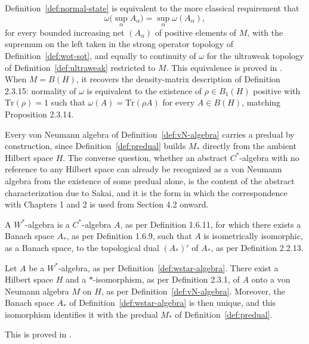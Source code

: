 \begin{remark}
	Definition~\ref{def:normal-state} is equivalent to the more classical
	requirement that
	\[
	\omega\Big(\sup_\alpha A_\alpha\Big) = \sup_\alpha \omega(A_\alpha),
	\]
	for every bounded increasing net $(A_\alpha)$ of positive elements of
	$M$, with the supremum on the left taken in the strong operator
	topology of Definition~\ref{def:wot-sot}, and equally to continuity of
	$\omega$ for the ultraweak topology of Definition~\ref{def:ultraweak}
	restricted to $M$. This equivalence is proved in \cite[TODO:
	collocazione precisa]{TODO-normalStates}. When $M = B(H)$, it recovers
	the density-matrix description of Definition 2.3.15: normality of
	$\omega$ is equivalent to the existence of $\rho \in B_1(H)$ positive
	with $\mathrm{Tr}(\rho) = 1$ such that $\omega(A) = \mathrm{Tr}(\rho A)$
	for every $A \in B(H)$, matching Proposition 2.3.14.
\end{remark}

Every von Neumann algebra of Definition~\ref{def:vN-algebra} carries a
predual by construction, since Definition~\ref{def:predual} builds
$M_*$ directly from the ambient Hilbert space $H$. The converse
question, whether an abstract $C^*$-algebra with no reference to any
Hilbert space can already be recognized as a von Neumann algebra from
the existence of some predual alone, is the content of the abstract
characterization due to Sakai, and it is the form in which the
correspondence with Chapters 1 and 2 is used from Section 4.2 onward.

\begin{definition}[$W^*$-algebra]\label{def:wstar-algebra}
	A $W^*$-algebra is a $C^*$-algebra $A$, as per Definition 1.6.11, for
	which there exists a Banach space $A_*$, as per Definition 1.6.9, such
	that $A$ is isometrically isomorphic, as a Banach space, to the
	topological dual $(A_*)'$ of $A_*$, as per Definition 2.2.13.
\end{definition}

\begin{theorem}[Sakai]\label{thm:sakai}
	Let $A$ be a $W^*$-algebra, as per Definition~\ref{def:wstar-algebra}.
	There exist a Hilbert space $H$ and a $*$-isomorphism, as per
	Definition 2.3.1, of $A$ onto a von Neumann algebra $M$ on $H$, as per
	Definition~\ref{def:vN-algebra}. Moreover, the Banach space $A_*$ of
	Definition~\ref{def:wstar-algebra} is then unique, and this isomorphism
	identifies it with the predual $M_*$ of Definition~\ref{def:predual}.
\end{theorem}
\noindent This is proved in \cite[TODO: collocazione precisa]{TODO-Sakai}.

